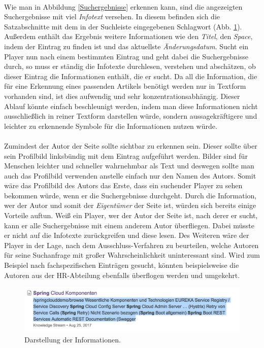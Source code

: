 \documentclass[a4paper,12pt,twoside]{scrartcl}
\begin{document}
\\
Wie man in Abbildung \ref{Suchergebnisse} erkennen kann, sind die angezeigten Suchergebnisse mit viel \textit{Infotext} versehen. In diesem befinden sich die Satzabschnitte mit dem in der Suchleiste eingegebenen Schlagwort (Abb. \ref{Infotext}). Außerdem enthält das Ergebnis weitere Informationen wie den \textit{Titel}, den \textit{Space}, indem der Eintrag zu finden ist und das aktuellste \textit{Änderungsdatum}. Sucht ein Player nun nach einem bestimmten Eintrag und geht dabei die Suchergebnisse durch, so muss er ständig die Infotexte durchlesen, verstehen und abschätzen, ob dieser Eintrag die Informationen enthält, die er sucht. Da all die Information, die für eine Erkennung eines passenden Artikels benötigt werden nur in Textform vorhanden sind, ist dies aufwendig und sehr konzentrationsabhängig. Dieser Ablauf könnte einfach beschleunigt werden, indem man diese Informationen nicht ausschließlich in reiner Textform darstellen würde, sondern aussagekräftigere und leichter zu erkennende Symbole für die Informationen nutzen würde.
\\\\
Zumindest der Autor der Seite sollte sichtbar zu erkennen sein. Dieser sollte über sein Profilbild linksbündig mit dem Eintrag aufgeführt werden. Bilder sind für Menschen leichter und schneller wahrnehmbar als Text und deswegen sollte man auch das Profilbild verwenden anstelle einfach nur den Namen des Autors. Somit wäre das Profilbild des Autors das Erste, dass ein suchender Player zu sehen bekommen würde, wenn er die Suchergebnisse durchgeht. Durch die Information, wer der Autor und somit der \textit{Eigentümer} der Seite ist, würden sich bereits einige Vorteile auftun. Weiß ein Player, wer der Autor der Seite ist, nach derer er sucht, kann er alle Suchergebnisse mit einem anderem Autor überfliegen. Dabei müsste er nicht auf die Infotexte zurückgreifen und diese lesen. Des Weiteren wäre der Player in der Lage, nach dem Ausschluss-Verfahren zu beurteilen, welche Autoren für seine Suchanfrage mit großer Wahrscheinlichkeit uninteressant sind. Wird zum Beispiel nach fachspezifischen Einträgen gesucht, könnten beispielsweise die Autoren aus der HR-Abteilung ebenfalls überflogen werden und umgekehrt.
\\
\begin{figure}[h!]
\begin{center}
\includegraphics[scale = 0.6]{Bilder/Infotext.png}
\caption{Darstellung der Informationen.}
\label{Infotext}
\end{center}
\end{figure}
\end{document}

